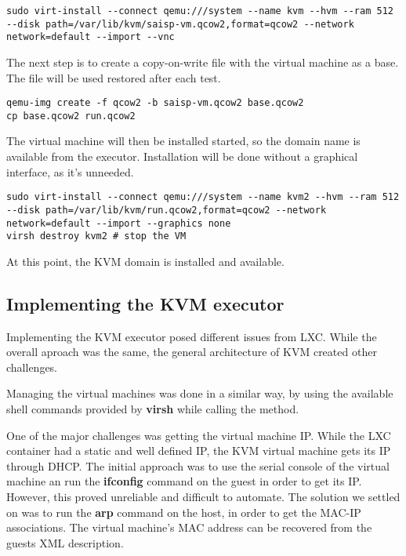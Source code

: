 \lstset{caption=Initial run of the virtual machine, label=lst:kvm-run}
\begin{lstlisting}
sudo virt-install --connect qemu:///system --name kvm --hvm --ram 512 --disk path=/var/lib/kvm/saisp-vm.qcow2,format=qcow2 --network network=default --import --vnc
\end{lstlisting}


The next step is to create a copy-on-write file with the virtual machine as a base.
The file will be used restored after each test.

\lstset{caption=Creating the target file, label=lst:kvm-base}
\begin{lstlisting}
qemu-img create -f qcow2 -b saisp-vm.qcow2 base.qcow2
cp base.qcow2 run.qcow2
\end{lstlisting}

The virtual machine will then be installed started, so the domain name is available
from the executor. Installation will be done without a graphical interface, 
as it's unneeded.


\lstset{caption=Install the KVM domain, label=lst:kvm-install}
\begin{lstlisting}
sudo virt-install --connect qemu:///system --name kvm2 --hvm --ram 512 --disk path=/var/lib/kvm/run.qcow2,format=qcow2 --network network=default --import --graphics none
virsh destroy kvm2 # stop the VM
\end{lstlisting}

At this point, the KVM domain is installed and available.

\subsection{Implementing the KVM executor}
\label{sub-sec:vmc-kvm-executor}

Implementing the KVM executor posed different issues from LXC. While the
overall aproach was the same, the general architecture of KVM created other
challenges. 

Managing the virtual machines was done in a similar way, by using the available
shell commands provided by \textbf{virsh} while calling the  method.

One of the major challenges was getting the virtual machine IP. While the
LXC container had a static and well defined IP, the KVM virtual machine gets
its IP through DHCP. The initial approach was to use the serial console of 
the virtual machine an run the \textbf{ifconfig} command on the guest in order
to get its IP. However, this proved unreliable and difficult to automate. The
solution we settled on was to run the \textbf{arp} command on the host, in order
to get the MAC-IP associations. The virtual machine's MAC address can be
recovered from the guests XML description.

